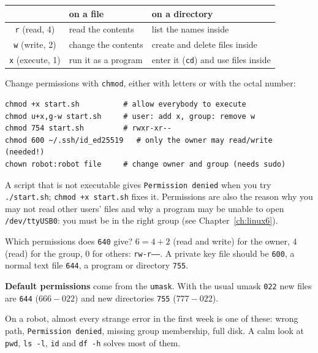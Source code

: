 \begin{center}
\renewcommand{\arraystretch}{1.2}
\begin{tabular}{c|p{5.4cm}|p{5.4cm}}
 & \textbf{on a file} & \textbf{on a directory}\\ \hline
\texttt{r} (read, 4) & read the contents & list the names inside\\
\texttt{w} (write, 2) & change the contents & create and delete files inside\\
\texttt{x} (execute, 1) & run it as a program & enter it (\texttt{cd}) and use files inside\\
\end{tabular}
\end{center}
Change permissions with \texttt{chmod}, either with letters or with the octal number:
\begin{verbatim}
chmod +x start.sh          # allow everybody to execute
chmod u+x,g-w start.sh     # user: add x, group: remove w
chmod 754 start.sh         # rwxr-xr--
chmod 600 ~/.ssh/id_ed25519   # only the owner may read/write (needed!)
chown robot:robot file     # change owner and group (needs sudo)
\end{verbatim}
A script that is not executable gives \texttt{Permission denied} when you try \verb|./start.sh|; \verb|chmod +x start.sh| fixes it. Permissions are also the reason why you may not read other users' files and why a program may be unable to open \texttt{/dev/ttyUSB0}: you must be in the right group (see Chapter~\ref{ch:linux6}).

\begin{example}
Which permissions does \texttt{640} give? $6=4+2$ (read and write) for the owner, $4$ (read) for the group, $0$ for others: \texttt{rw-r-----}. A private key file should be \texttt{600}, a normal text file \texttt{644}, a program or directory \texttt{755}.
\end{example}

\textbf{Default permissions} come from the \texttt{umask}. With the usual umask \texttt{022} new files are \texttt{644} ($666-022$) and new directories \texttt{755} ($777-022$).

\begin{aibox}
On a robot, almost every strange error in the first week is one of these: wrong path, \texttt{Permission denied}, missing group membership, full disk. A calm look at \texttt{pwd}, \texttt{ls -l}, \texttt{id} and \texttt{df -h} solves most of them.
\end{aibox}

